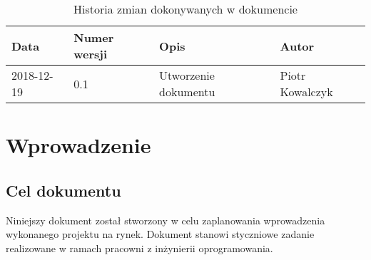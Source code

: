 \documentclass{article}
\begin{document}
\begin{titlepage}







\end{titlepage}

\addtocounter{page}{1}
\newpage

\begin{table}[h!]
 \begin{center}
	\caption{Historia zmian dokonywanych w dokumencie}
   \begin{tabular}{|l|l|l|l|}
		\hline
		Data & Numer wersji & Opis & Autor \\
		\hline \hline
		2018-12-19 & 0.1 & Utworzenie dokumentu & Piotr Kowalczyk \\
		\hline
  \end{tabular}
 \end{center}
\end{table}	


\tableofcontents

\newpage


\section{Wprowadzenie}
\subsection{Cel dokumentu}
Niniejszy dokument został stworzony w celu zaplanowania wprowadzenia wykonanego projektu na rynek.
Dokument stanowi styczniowe zadanie realizowane w ramach pracowni z inżynierii oprogramowania.
\end{document}
